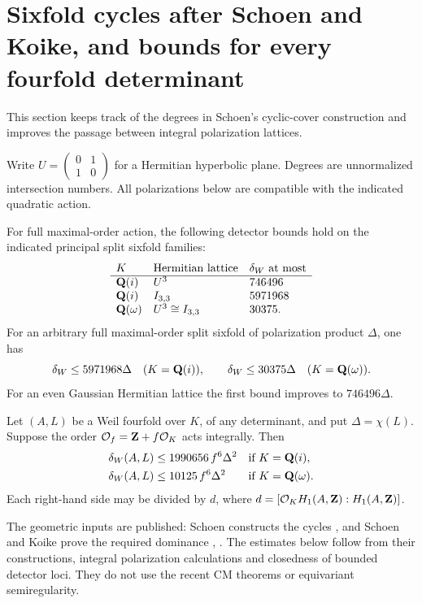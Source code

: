\section{Sixfold cycles after Schoen and Koike, and bounds for every fourfold determinant}
\label{sec:sixfolds}
This section keeps track of the degrees in Schoen's cyclic-cover construction and improves the passage between integral polarization lattices.

Write $U=\left(\begin{smallmatrix}0&1\\1&0\end{smallmatrix}\right)$ for a Hermitian hyperbolic plane. Degrees are unnormalized intersection numbers. All polarizations below are compatible with the indicated quadratic action.

\begin{theorem}\label{thm:sixfold-suppliers}
For full maximal-order action, the following detector bounds hold on the indicated principal split sixfold families:
\[
\begin{array}{lll}
K&\text{Hermitian lattice}&\delta_W\text{ at most}\\
\hline
\mathbf Q(i)&U^3&746496\\
\mathbf Q(i)&I_{3,3}&5971968\\
\mathbf Q(\omega)&U^3\cong I_{3,3}&30375.
\end{array}
\]
For an arbitrary full maximal-order split sixfold of polarization product $\Delta$, one has
\[
 \delta_W\le5971968\Delta\quad(K=\mathbf Q(i)),
 \qquad \delta_W\le30375\Delta\quad(K=\mathbf Q(\omega)).
\]
For an even Gaussian Hermitian lattice the first bound improves to $746496\Delta$.
\end{theorem}

\begin{theorem}\label{thm:all-determinant-fourfolds}
Let $(A,L)$ be a Weil fourfold over $K$, of any determinant, and put $\Delta=\chi(L)$. Suppose the order $\mathcal O_f=\mathbf Z+f\mathcal O_K$ acts integrally. Then
\[
\begin{aligned}
 \delta_W(A,L)&\le1990656\,f^6\Delta^2
 &&\text{if }K=\mathbf Q(i),\\
 \delta_W(A,L)&\le10125\,f^6\Delta^2
 &&\text{if }K=\mathbf Q(\omega).
\end{aligned}
\]
Each right-hand side may be divided by $d$, where
$d=[\mathcal O_KH_1(A,\mathbf Z):H_1(A,\mathbf Z)]$.
\end{theorem}

The geometric inputs are published: Schoen constructs the cycles \cite[Theorem~2.0 and \S3]{Schoen88}, and Schoen and Koike prove the required dominance \cite[Lemma~13, pp.~334--335]{Schoen98}, \cite[Theorem~2.1, p.~568]{Koike}. The estimates below follow from their constructions, integral polarization calculations and closedness of bounded detector loci. They do not use the recent CM theorems or equivariant semiregularity.

